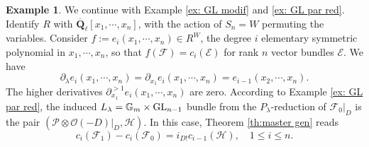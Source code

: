 \documentclass[reqno]{amsart}
\numberwithin{equation}{subsection}
\theoremstyle{definition}
\newtheorem{exam}[subsubsection]{Example}
\def\GG{\mathbb{G}}
\newcommand\cE{\mathcal{E}}
\newcommand\cF{\mathcal{F}}
\newcommand\cH{\mathcal{H}}
\newcommand\cO{\mathcal{O}}
\newcommand\cP{\mathcal{P}}
\newcommand\GL{\textup{GL}}
\newcommand{\Gm}{\GG_m}
\newcommand{\Qlbar}{\overline{\Q}_\ell}
\newcommand{\wt}[1]{\widetilde{#1}}
\newcommand\ot{\otimes}
\newcommand{\cohog}[2]{\textup{H}^{#1}({#2})}     %
\renewcommand{\l}{\lambda}
\newcommand\pl{\partial}
\newcommand\mnote[1]{\marginpar{\tiny #1}}
\newcommand{\Q}{\mathbf{Q}}
\begin{document}
\begin{exam}\label{ex: GL} 
We continue with Example \ref{ex: GL modif} and \ref{ex: GL par red}. Identify $R$ with $\Qlbar[x_1,\cdots, x_n]$, with the action of $S_n=W$ permuting the variables. 
Consider $f:=e_{i}(x_{1},\cdots, x_{n})\in R^W$, the degree $i$ elementary symmetric polynomial in $x_{1},\cdots, x_{n}$, so that $f(\cF)=c_{i}(\cE)$ for rank $n$ vector bundles $\cE$. We have
\begin{equation*}
\pl_{\l}e_{i}(x_{1},\cdots, x_{n})=\pl_{x_{1}}e_{i}(x_{1},\cdots, x_{n})=e_{i-1}(x_{2},\cdots, x_{n}).
\end{equation*}
The higher derivatives $\pl^{>1}_{x_{1}}e_{i}(x_{1},\cdots, x_{n})$ are zero. According to Example \ref{ex: GL par red}, the induced $L_\l=\Gm\times \GL_{n-1}$ bundle from the $P_\l$-reduction of $\cF_0|_D$ is the pair $(\cP\ot \cO(-D)|_D, \cH)$. In this case, Theorem \ref{th:master gen} reads
\begin{equation}\label{Chern class diff}
c_{i}(\cF_{1})-c_{i}(\cF_{0})=i_{D!}c_{i-1}(\cH), \quad 1\le i\le n.
\end{equation}

\end{exam}
\end{document}
